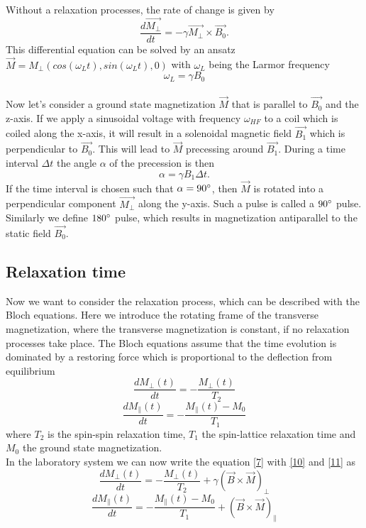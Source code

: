 Without a relaxation processes, the rate of change is given by
\begin{equation}
	\label{7}
	\dfrac{d\vec{M_{\perp}}}{dt} = - \gamma \vec{M_{\perp}} \times \vec{B_{0}}.
\end{equation}
This differential equation can be solved by an ansatz $\vec{M} = M_{\perp}(cos(\omega_{L} t),sin(\omega_{L} t),0)$ with $\omega_{L}$ being the Larmor frequency 
\begin{equation}
	\label{8}
	\omega_{L} = \gamma B_{0}
\end{equation}
\vspace{5mm} \\
Now let's consider a ground state magnetization $\vec{M}$ that is parallel to $\vec{B_0}$ and the z-axis. If we apply a sinusoidal voltage with frequency $\omega_{HF}$ to a coil which is coiled along the x-axis, it will result in a solenoidal magnetic field $\vec{B_1}$ which is perpendicular to $\vec{B_0}$. This will lead to $\vec{M}$ precessing around $\vec{B_1}$. During a time interval $\Delta t$ the angle $\alpha$ of the precession is then 
\begin{equation}
	\label{9}
	\alpha = \gamma B_{1} \Delta t.
\end{equation}
If the time interval is chosen such that $\alpha = 90 \degree$, then $\vec{M}$ is rotated into a perpendicular component $\vec{M_{\perp}}$ along the y-axis. Such a pulse is called a $90 \degree$ pulse. Similarly we define $180 \degree$ pulse, which results in magnetization antiparallel to the static field $\vec{B_{0}}$.
\subsection{Relaxation time}\label{relax}
Now we want to consider the relaxation process, which can be described with the Bloch equations. Here we introduce the rotating frame of the transverse magnetization, where the transverse magnetization is constant, if no relaxation processes take place. The Bloch equations assume that the time evolution is dominated by a restoring force which is proportional to the deflection from equilibrium
\begin{equation}
	\label{10}
	\dfrac{dM_{\perp}(t)}{dt} = - \dfrac{M_{\perp}(t)}{T_{2}}
\end{equation}
\begin{equation}
	\label{11}
	\dfrac{dM_{\parallel}(t)}{dt} = - \dfrac{M_{\parallel}(t)-M_{0}}{T_{1}}
\end{equation}
where $T_{2}$ is the spin-spin relaxation time, $T_{1}$ the spin-lattice relaxation time and $M_{0}$ the ground state magnetization.
\vspace{3mm}\\
In the laboratory system we can now write the equation \eqref{7} with \eqref{10} and \eqref{11} as
\begin{equation}
	\label{12}
	\dfrac{dM_{\perp}(t)}{dt} = - \dfrac{M_{\perp}(t)}{T_{2}} + \gamma ( \vec{B} \times \vec{M})_{\perp}
\end{equation}
\begin{equation}
	\label{13}
	\dfrac{dM_{\parallel}(t)}{dt} = - \dfrac{M_{\parallel}(t)-M_{0}}{T_{1}} + ( \vec{B} \times \vec{M})_{\parallel}
\end{equation}
